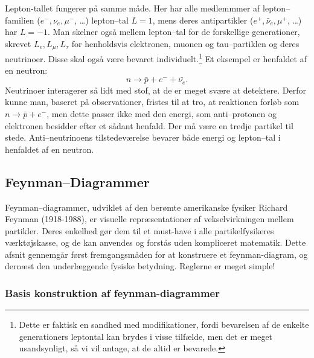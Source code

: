 Lepton-tallet fungerer på samme måde. Her har alle medlemmmer af
lepton--familien ($e^-,\nu_e, \mu^-$, \dots) lepton--tal $L=1$, mens
deres antipartikler ($e^+, \bar{\nu}_e, \mu^+$, \dots) har $L=-1$. Man
skelner også mellem lepton--tal for de forskellige generationer,
skrevet $L_e, L_\mu,L_\tau$ for henholdsvis elektronen, muonen og
tau--partiklen og deres neutrinoer. Disse skal også være bevaret
individuelt.\footnote{Dette er faktisk en sandhed med modifikationer,
  fordi bevarelsen af de enkelte generationers leptontal kan brydes i
  visse tilfælde, men det er meget usandsynligt, så vi vil antage, at
  de altid er bevarede.} Et eksempel er henfaldet af en neutron:
\begin{equation*}
n \rightarrow \bar{p} + e^- + \bar{\nu_e}.
\end{equation*} 
Neutrinoer interagerer så lidt med stof, at de er meget svære at
detektere. Derfor kunne man, baseret på observationer, fristes til at
tro, at reaktionen forløb som $n \rightarrow \bar{p} + e^-$, men dette
passer ikke med den energi, som anti--protonen og elektronen besidder
efter et sådant henfald. Der må være en tredje partikel til
stede. Anti--neutrinoens tilstedeværelse bevarer både energi og
lepton--tal i henfaldet af en neutron.

\subsection{Feynman--Diagrammer}
\label{sec:feyman}
Feynman--diagrammer, udviklet af den berømte amerikanske fysiker
Richard Feynman (1918-1988), er visuelle repræsentationer af
vekselvirkningen mellem partikler. Deres enkelhed gør dem til et
must-have i alle partikelfysikeres værktøjskasse, og de kan anvendes
og forstås uden kompliceret matematik. Dette afsnit gennemgår først
fremgangsmåden for at konstruere et feynman-diagram, og dernæst den
underlæggende fysiske betydning. Reglerne er meget simple!

\subsubsection{Basis konstruktion af feynman-diagrammer}

